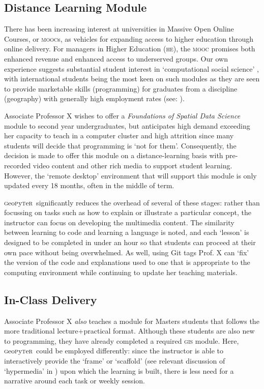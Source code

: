 \documentclass[letter, 11pt,titlepage]{article}
\newcommand{\gp}{\textsc{g}eo\textsc{p}y\textsc{t}e\textsc{r}~\/}
\begin{document}
\subsection{Distance Learning Module}\label{an-online-module}

There has been increasing interest at universities in Massive Open Online Courses, or \textsc{mooc}s, as vehicles for expanding access to higher education through online delivery. For managers in Higher Education (\textsc{he}), the \textsc{mooc} promises both enhanced revenue and enhanced access to underserved groups. Our own experience suggests substantial student interest in `computational social science' \citep{Lazer2009}, with international students being the most keen on such modules as they are seen to provide marketable skills (programming) for graduates from a discipline (geography) with generally high employment rates (see: \citeauthor{rgs2017} \citeyear{rgs2017}).

Associate Professor X wishes to offer a \emph{Foundations of Spatial Data Science} module to second year undergraduates, but anticipates high demand exceeding her capacity to teach in  a computer cluster and high attrition since many students will decide that programming is `not for them'. Consequently, the decision is made to offer this module on a distance-learning basis with pre-recorded video content and other rich media to support student learning. However, the `remote desktop' environment that will support this module is only updated every 18 months, often in the middle of term.

\gp significantly reduces the overhead of several of these stages: rather than focussing on tasks such as how to explain or illustrate a particular concept, the instructor can focus on developing the multimedia content. The similarity between learning to code and learning a language is noted, and each `lesson' is designed to be completed in under an hour so that students can proceed at their own pace without being overwhelmed. As well, using Git tags Prof. X can `fix' the version of the code and explanations used to one that is appropriate to the computing environment while continuing to update her teaching materials.

\subsection{In-Class Delivery}\label{in-class-delivery}

Associate Professor X \emph{also} teaches a module for Masters students that follows the more traditional lecture+practical format. Although these students are also new to programming, they have already completed a required \textsc{gis} module. Here, \gp could be employed differently: since the instructor is able to interactively provide the `frame' or `scaffold' (see relevant discussion of `hypermedia' in \citealp{Azevedo2008}) upon which the learning is built, there is less need for a narrative around each task or weekly session. 
\end{document}
